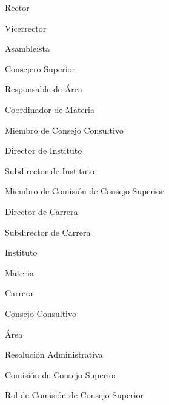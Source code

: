     \item Rector
    \item Vicerrector
    \item Asambleísta
    \item Consejero Superior
    \item Responsable de Área
    \item Coordinador de Materia
    \item Miembro de Consejo Consultivo
    \item Director de Instituto
    \item Subdirector de Instituto
    \item Miembro de Comisión de Consejo Superior
    \item Director de Carrera
    \item Subdirector de Carrera
    \item Instituto
    \item Materia
    \item Carrera
    \item Consejo Consultivo
    \item Área
    \item Resolución Administrativa
    \item Comisión de Consejo Superior
    \item Rol de Comisión de Consejo Superior
